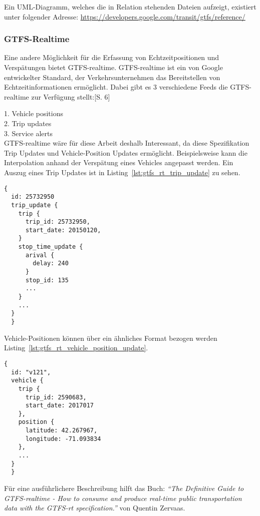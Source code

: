       Ein UML-Diagramm, welches die in Relation stehenden Dateien aufzeigt, existiert unter folgender Adresse: \url{https://developers.google.com/transit/gtfs/reference/} 
    
    
    \subsubsection{GTFS-Realtime}
    \label{ssub:gtfs_realtime}
      Eine andere Möglichkeit für die Erfassung von Echtzeitpositionen und Verspätungen bietet GTFS-realtime. GTFS-realtime ist ein von Google entwickelter Standard, der Verkehrsunternehmen das Bereitstellen von Echtzeitinformationen ermöglicht. Dabei gibt es 3 verschiedene Feeds die GTFS-realtime zur Verfügung stellt:\parencite{zervaas_realtime}[S. 6]

      1. Vehicle positions\\
      2. Trip updates\\
      3. Service alerts\\

      GTFS-realtime wäre für diese Arbeit deshalb Interessant, da diese Spezifikation Trip Updates und Vehicle-Position Updates ermöglicht. Beispielsweise kann die Interpolation anhand der Verspätung eines Vehicles angepasst werden. Ein Auszug eines Trip Updates ist in Listing~\ref{lst:gtfs_rt_trip_update} zu sehen.

      \begin{lstlisting}[captionpos=b, caption={Auszug eines GTFS-realtime Trip Updates von MBTA},label={lst:gtfs_rt_trip_update}]
  {
  id: 25732950
  trip_update {
    trip {
      trip_id: 25732950,
      start_date: 20150120,
    }
    stop_time_update {
      arival {
        delay: 240
      }
      stop_id: 135
      ...
    }
    ...
  }
  }
    \end{lstlisting}

    Vehicle-Positionen können über ein ähnliches Format bezogen werden Listing~\ref{lst:gtfs_rt_vehicle_position_update}.

    \begin{lstlisting}[captionpos={b},caption={Auszug eines GTFS-realtime Vehicle-Position Updates von MBTA},label={lst:gtfs_rt_vehicle_position_update}]
  {
  id: "v121",
  vehicle {
    trip {
      trip_id: 2590683,
      start_date: 2017017
    },
    position {
      latitude: 42.267967,
      longitude: -71.093834
    },
    ...
  }
  }
    \end{lstlisting}

  Für eine ausführlichere Beschreibung hilft das Buch: \textit{"`The Definitive Guide to GTFS-realtime - How to consume and produce real-time public transportation data with the GTFS-rt specification."'}\parencite{zervaas_realtime} von Quentin Zervaas.\\


